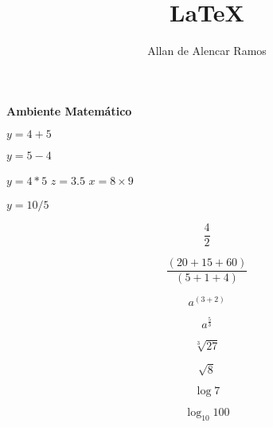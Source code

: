 \documentclass[12pt, a4paper]{article}
\begin{document}
\title{LaTeX}
\author{Allan de Alencar Ramos}
\maketitle

\begin{center}
\large\textbf{Ambiente Matemático}
\end{center}
\vspace{0.5cm}

$ y = 4 + 5 $

$ y = 5 - 4 $

$ y = 4 * 5 $
$ z = 3.5 $
$ x = 8 \times 9 $

$ y = 10 / 5 $

\begin{equation}
\frac{4}{2}
\end{equation}

\begin{equation}
\frac{( 20 + 15 + 60 )}{( 5 + 1 + 4 )}
\end{equation}

\begin{equation}
a^{( 3 + 2 )}
\end{equation}

\begin{equation}
a^{\frac{5}{3}}
\end{equation}

\begin{equation}
\sqrt[3]{27}
\end{equation}

\begin{equation}
\sqrt{8}
\end{equation}

\begin{equation}
\log 7
\end{equation}

\begin{equation}
\log_{10} 100
\end{equation}
\end{document}
